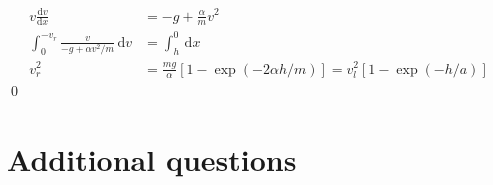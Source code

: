 \documentclass[12pt]{article}
\begin{document}
\begin{equation}
\begin{split}
    v \frac{\mathrm{d}v}{\mathrm{d}x} &= -g + \frac{\alpha}{m} v^{2} \\
    \int_{0}^{-v_{r}} \frac{v}{-g + \alpha v^{2}/m} \, \mathrm{d}v &= \int_{h}^{0} \, \mathrm{d}x \\
    v_{r}^{2} &= \frac{mg}{\alpha} [1 - \exp(-2\alpha h/m)] = v_{l}^{2}[1 - \exp(-h/a)]
\end{split}
\end{equation}
\qed


\pagebreak
\section*{Additional questions}
\end{document}
